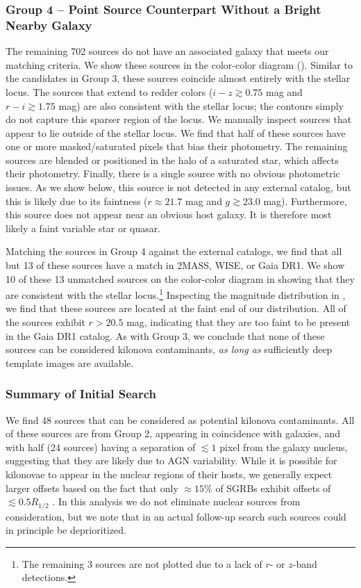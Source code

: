 \subsubsection{Group 4 -- Point Source Counterpart Without a Bright Nearby Galaxy}
\label{sec:ch3_group4}

The remaining 702 sources do not have an associated galaxy that meets our matching criteria. We show these sources in the color-color diagram (). Similar to the candidates in Group 3, these sources coincide almost entirely with the stellar locus. The sources that extend to redder colors ($i-z \gtrsim 0.75$ mag and $r-i \gtrsim 1.75$ mag) are also consistent with the stellar locus; the contours simply do not capture this sparser region of the locus. We manually inspect sources that appear to lie outside of the stellar locus. We find that half of these sources have one or more masked/saturated pixels that bias their photometry. The remaining sources are blended or positioned in the halo of a saturated star, which affects their photometry. Finally, there is a single source with no obvious photometric issues. As we show below, this source is not detected in any external catalog, but this is likely due to its faintness ($r \approx 21.7$ mag and $g \gtrsim 23.0$ mag). Furthermore, this source does not appear near an obvious host galaxy. It is therefore most likely a faint variable star or quasar.

Matching the sources in Group 4 against the external catalogs, we find that all but 13 of these sources have a match in 2MASS, WISE, or Gaia DR1. We show 10 of these 13 unmatched sources on the color-color diagram in  showing that they are consistent with the stellar locus.\footnote{The remaining 3 sources are not plotted due to a lack of $r$- or $z$-band detections.} Inspecting the magnitude distribution in , we find that these sources are located at the faint end of our distribution. All of the sources exhibit $r > 20.5$ mag, indicating that they are too faint to be present in the Gaia DR1 catalog. As with Group 3, we conclude that none of these sources can be considered kilonova contaminants, {\it as long as} sufficiently deep template images are available.

\subsubsection{Summary of Initial Search}
\label{sec:ch3_search_summary}
We find 48 sources that can be considered as potential kilonova contaminants. All of these sources are from Group 2, appearing in coincidence with galaxies, and with half (24 sources) having a separation of $\lesssim 1$ pixel from the galaxy nucleus, suggesting that they are likely due to AGN variability. While it is possible for kilonovae to appear in the nuclear regions of their hosts, we generally expect larger offsets based on the fact that only $\approx 15\%$ of SGRBs exhibit offsets of $\lesssim 0.5 R_{1/2}$ \citep{FongBerger13,Fong+13,Berger2014}. In this analysis we do not eliminate nuclear sources from consideration, but we note that in an actual follow-up search such sources could in principle be deprioritized.

